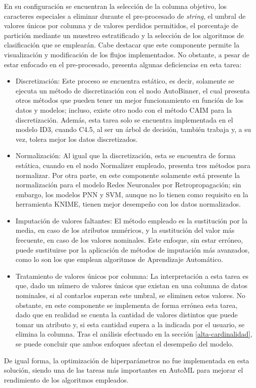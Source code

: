 En su configuración se encuentran la selección de la columna objetivo, los caracteres especiales a eliminar durante el pre-procesado de \textit{string}, el umbral de valores únicos por columna y de valores perdidos permitidos, el porcentaje de partición mediante un muestreo estratificado y la selección de los algoritmos de clasificación que se emplearán. Cabe destacar que este componente permite la visualización y modificación de los flujos implementados. No obstante, a pesar de estar enfocado en el pre-procesado, presenta algunas deficiencias en esta tarea:
\begin{itemize}
	\item Discretización: Este proceso se encuentra estático, es decir, solamente se ejecuta un método de discretización con el nodo AutoBinner, el cual presenta otros métodos que pueden tener un mejor funcionamiento en función de los datos y modelos; incluso, existe otro nodo con el método CAIM para la discretización. Además, esta tarea solo se encuentra implementada en el modelo ID3, cuando C4.5, al ser un árbol de decisión, también trabaja y, a su vez, tolera mejor los datos discretizados.
	\item Normalización: Al igual que la discretización, esta se encuentra de forma estática, cuando en el nodo Normalizer empleado, presenta tres métodos para normalizar. Por otra parte, en este componente solamente está presente la normalización para el modelo Redes Neuronales por Retropropagación; sin embargo, los modelos PNN y SVM, aunque no lo tienen como requisito en la herramienta KNIME, tienen mejor desempeño con los datos normalizados.
	\item Imputación de valores faltantes: El método empleado es la sustitución por la media, en caso de los atributos numéricos, y la sustitución del valor más frecuente, en caso de los valores nominales. Este enfoque, sin estar erróneo, puede sustituirse por la aplicación de métodos de imputación más avanzados, como lo son los que emplean algoritmos de Aprendizaje Automático.
	\item Tratamiento de valores únicos por columna: La interpretación a esta tarea es que, dado un número de valores únicos que existan en una columna de datos nominales, si al contarlos superan este umbral, se eliminen estos valores. No obstante, en este componente se implementa de forma errónea esta tarea, dado que en realidad se cuenta la cantidad de valores distintos que puede tomar un atributo y, si esta cantidad supera a la indicada por el usuario, se elimina la columna. Tras el análisis efectuado en la sección \ref{alta-cardinalidad}, se puede concluir que ambos enfoques afectan el desempeño del modelo.
\end{itemize}
De igual forma, la optimización de hiperparámetros no fue implementada en esta solución, siendo una de las tareas más importantes en AutoML para mejorar el rendimiento de los algoritmos empleados.

